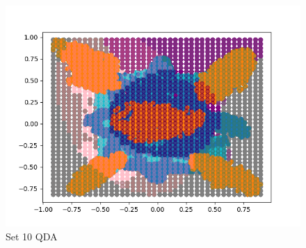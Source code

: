 \documentclass{article}
\begin{document}
\begin{figure}[H]
\begin{minipage}{.33\textwidth}
			\includegraphics[width=1\linewidth]{../set10QDAdecisions.png}
			\caption{Set 10 QDA}
	\end{minipage}\hfill
\end{figure}
\end{document}

